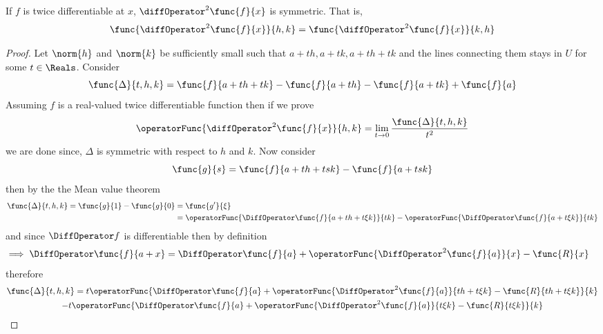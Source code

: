 \begin{theorem}
    If \(f\) is twice differentiable at \(x\), \(\diffOperator^2 \func{f}{x}\) is symmetric. That is,
    \begin{equation*}
        \func{\diffOperator^2 \func{f}{x}}{h,k} = \func{\diffOperator^2 \func{f}{x}}{k,h}
    \end{equation*}
\end{theorem}

\begin{proof}
    Let \(\norm{h}\) and \(\norm{k}\) be sufficiently small such that \(a + th, a+  tk , a+th + tk\) and the lines connecting them stays in \(U\) for some \(t \in \Reals\). Consider
    \begin{equation*}
        \func{\Delta}{t,h,k} = \func{f}{a + th + tk} - \func{f}{a + th} - \func{f}{a  + tk} + \func{f}{a}
    \end{equation*}
    Assuming \(f\) is a real-valued twice differentiable function then if we prove
    \begin{equation*}
        \operatorFunc{\diffOperator^2 \func{f}{x}}{h,k} = \lim_{t \to 0} \dfrac{\func{\Delta}{t,h,k}}{t^2}
    \end{equation*}
    we are done since, \(\Delta\) is symmetric with respect to \(h\) and \(k\). Now consider
    \begin{equation*}
        \func{g}{s} = \func{f}{a + th + tsk} - \func{f}{a  + tsk}
    \end{equation*}
    then by the the Mean value theorem
    \begin{align*}
        \func{\Delta}{t,h,k} = \func{g}{1} - \func{g}{0} & = \func{g'}{\xi}                                                                                                       \\
                                                         & =\operatorFunc{ \DiffOperator \func{f}{a + th + t\xi k}}{tk} - \operatorFunc{ \DiffOperator \func{f}{a  + t\xi k}}{tk}
    \end{align*}
    and since \(\DiffOperator f\) is differentiable then by definition
    \begin{align*}
        \implies \DiffOperator \func{f}{a+x} & = \DiffOperator \func{f}{a} + \operatorFunc{\DiffOperator^2 \func{f}{a}}{x} - \func{R}{x}
    \end{align*}
    therefore
    \begin{multline*}
        \func{\Delta}{t,h,k} = t\operatorFunc{\DiffOperator \func{f}{a } + \operatorFunc{\DiffOperator^2 \func{f}{a}}{th + t\xi k} - \func{R}{th + t\xi k}}{k} \\- t\operatorFunc{\DiffOperator \func{f}{a} + \operatorFunc{\DiffOperator^2 \func{f}{a}}{t\xi k} - \func{R}{t\xi k}}{k}

\end{multline*}
\end{proof}
